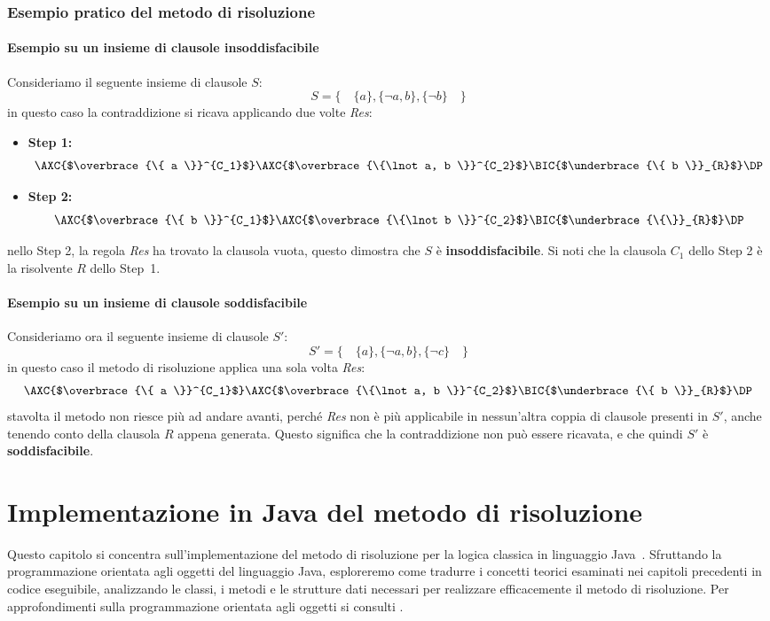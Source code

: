 \documentclass[a4paper,12pt]{report}
\begin{document}
\subsection{Esempio pratico del metodo di risoluzione}
\subsubsection{Esempio su un insieme di clausole insoddisfacibile}
\label{resolution_example}
Consideriamo il seguente insieme di clausole $S$:
\[ S = \{ \quad \{a\}, \{\lnot a, b\}, \{\lnot b\} \quad \} \]
in questo caso la contraddizione si ricava applicando due volte \emph{Res}:

\begin{itemize}
    \item \textbf{Step 1:}
    \[
    \AXC{$\overbrace{\{ a \}}^{C_1}$}
    \AXC{$\overbrace{\{\lnot a, b \}}^{C_2}$}
    \RightLabel{Res}
    \BIC{$\underbrace{\{ b \}}_{R}$}
    \DP
    \]
    \item \textbf{Step 2:}
    \[
    \AXC{$\overbrace{\{ b \}}^{C_1}$}
    \AXC{$\overbrace{\{\lnot b \}}^{C_2}$}
    \RightLabel{Res}
    \BIC{$\underbrace{\{\}}_{R}$}
    \DP
    \]
\end{itemize}
nello Step 2, la regola \emph{Res} ha trovato la clausola vuota, questo dimostra che $S$ è \textbf{insoddisfacibile}. Si noti che la clausola $C_1$ dello Step 2 è la risolvente $R$ dello Step~1.

\subsubsection{Esempio su un insieme di clausole soddisfacibile}
Consideriamo ora il seguente insieme di clausole $S'$:
\[ S' = \{ \quad \{a\}, \{\lnot a, b\}, \{\lnot c\} \quad \} \]
in questo caso il metodo di risoluzione applica una sola volta \emph{Res}:
\[
    \AXC{$\overbrace{\{ a \}}^{C_1}$}
    \AXC{$\overbrace{\{\lnot a, b \}}^{C_2}$}
    \RightLabel{Res}
    \BIC{$\underbrace{\{ b \}}_{R}$}
    \DP
\]
stavolta il metodo non riesce più ad andare avanti, perché \emph{Res} non è più applicabile in nessun'altra coppia di clausole presenti in $S'$, anche tenendo conto della clausola $R$ appena generata. Questo significa che la contraddizione non può essere ricavata, e che quindi $S'$ è \textbf{soddisfacibile}.

% 
% 
\chapter{Implementazione in Java del metodo di risoluzione}
\label{impl}
Questo capitolo si concentra sull'implementazione del metodo di risoluzione per la logica classica in linguaggio Java~\cite{Java}. Sfruttando la programmazione orientata agli oggetti del linguaggio Java, esploreremo come tradurre i concetti teorici esaminati nei capitoli precedenti in codice eseguibile, analizzando le classi, i metodi e le strutture dati necessari per realizzare efficacemente il metodo di risoluzione. Per approfondimenti sulla programmazione orientata agli oggetti si consulti \cite{Liskov}.
\end{document}
